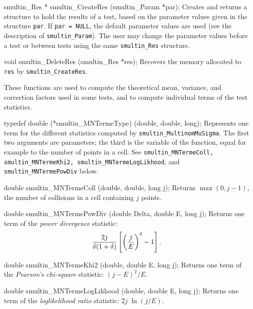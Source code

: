 smultin_Res * smultin_CreateRes (smultin_Param *par);
\endcode
 \tab
  Creates and returns a structure to hold the results of a test,
  based on the parameter values given in the structure {\tt par}.
  If {\tt par = NULL}, the default parameter values are used
  (see the description of {\tt smultin\_Param}). The user may change
  the parameter values before a test or between tests using the same
  {\tt smultin\_Res} structure.
 \endtab
\code


void smultin_DeleteRes (smultin_Res *res);
\endcode
 \tab
  Recovers the memory allocated to {\tt res} by {\tt smultin\_CreateRes}.
 \endtab




These functions are used to compute the theoretical mean, variance,
and correction factors used in some tests, and to compute individual terms
of the test statistics.

\code

typedef double (*smultin_MNTermeType) (double, double, long);
\endcode
  \tab Represents one term for the different
   statistics computed by {\tt smultin\_MultinomMuSigma}.
   The first two arguments are parameters;
   the third is  the variable of the function, equal for example to the
   number of points in a cell.  See {\tt smultin\_MNTermeColl,
   smultin\_MNTermeKhi2, smultin\_MNTermeLogLikhood}, and
   {\tt smultin\_MNTermePowDiv} below.
  \endtab
\code


double smultin_MNTermeColl (double, double, long j);
\endcode
 \tab Returns $\max(0, j-1)$, the number of collisions in a cell
  containing $j$ points.
 \endtab
\code


double smultin_MNTermePowDiv (double Delta, double E, long j);
\endcode
 \tab Returns one term of the {\sl power divergence} statistic:
  $${2j\over \delta(1+\delta)}
      \left[\left(j \over E\right)^\delta -1\right].$$
 \endtab
\code

double smultin_MNTermeKhi2 (double, double E, long j);
\endcode
 \tab Returns one term of the {\em Pearson's chi-square\/} statistic:
   $ (j - E)^2 / E$.
 \endtab
\code


double smultin_MNTermeLogLikhood (double, double E, long j);
\endcode
 \tab Returns one term of the {\em loglikelihood ratio\/} statistic:
    $ 2 j\; \ln \left(j / E\right)$.
 \endtab
\code


